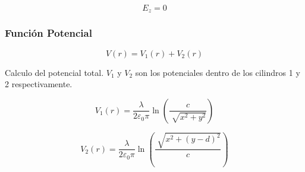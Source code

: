 \documentclass{article}
\begin{document}
    \begin{equation}
		E_z = 0
	\end{equation}
    

\subsubsection{Función Potencial} 
	
    \begin{equation}
		V(r) = V_1(r) + V_2(r)	
    \end{equation}
    
    Calculo del potencial total. $V_1$ y $V_2$ son los potenciales dentro de los cilindros 1 y 
    2 respectivamente.
    
	\begin{equation}
    	V_1(r) = \frac{\lambda}{2 \varepsilon_0 \pi}\ln \left({\frac{c}{\sqrt[]{x^2 + y^2}}}\right)
    \end{equation}
    
    \begin{equation}
		V_2(r) = \frac{\lambda}{2 \varepsilon_0 \pi}\ln \left({\frac{\sqrt[]{x^2 + (y-d)^2}}{c}}\right)
	\end{equation}
    
\end{document}
